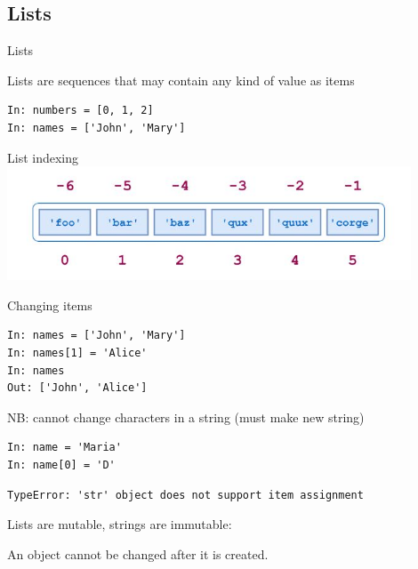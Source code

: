 \documentclass[aspectratio=169,usenames,dvipsnames]{beamer}
\begin{document}
\subsection{Lists}
\frame{\tableofcontents[currentsubsection]}

\begin{frame}[fragile]{Lists}
    \begin{definition}
    Lists are sequences that may contain any kind of value as items
    \end{definition}
\begin{lstlisting} 
In: numbers = [0, 1, 2]
In: names = ['John', 'Mary']
\end{lstlisting} 
\end{frame}

\begin{frame}[fragile]{List indexing}
\includegraphics[width=0.9\textwidth]{fig/list}
\end{frame}

\begin{frame}[fragile]{Changing items}
\begin{lstlisting} 
In: names = ['John', 'Mary']
In: names[1] = 'Alice'
In: names
Out: ['John', 'Alice']
\end{lstlisting} 

\pause
NB: cannot change characters in a string (must make new string)
\begin{lstlisting} 
In: name = 'Maria'
In: name[0] = 'D'
\end{lstlisting}\vspace{-1em}\begin{lstlisting}[style=plain]
TypeError: 'str' object does not support item assignment
\end{lstlisting}

Lists are mutable, strings are immutable:
\begin{definition}
An  object cannot be changed after it is created.
\end{definition}
\end{frame}
\end{document}
